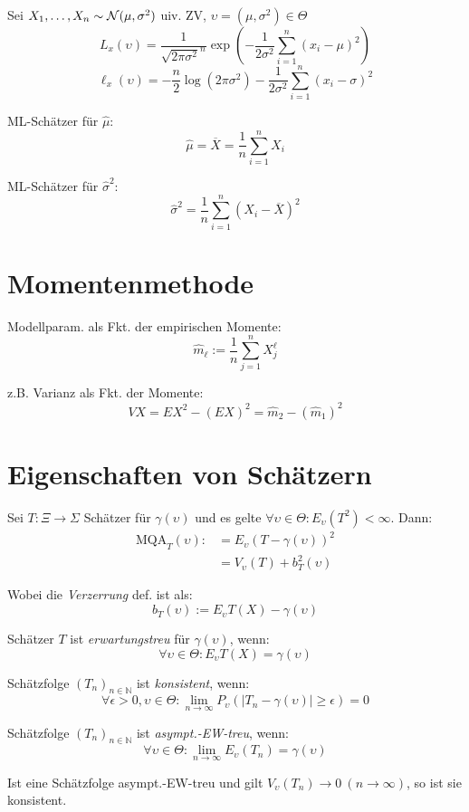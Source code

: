Sei \(X_1, \dots, X_n \sim \mathcal{N}(\mu,\sigma^2)\) uiv. ZV, \(\upsilon = (\mu,\sigma^2) \in \Theta\)
\[ L_x(\upsilon) = \frac{1}{\sqrt{2\pi\sigma^2}^n} \exp\left( -\frac{1}{2\sigma^2} \sum_{i=1}^n (x_i-\mu)^2 \right) \]
\[ \ell_x(\upsilon) = -\frac{n}{2} \log(2\pi\sigma^2) - \frac{1}{2\sigma^2} \sum_{i=1}^n (x_i-\sigma)^2 \]

ML-Schätzer für \(\hat\mu\):
\[ \hat\mu = \overline X = \frac{1}{n}\sum_{i=1}^n X_i \]

ML-Schätzer für \(\hat\sigma^2\):
\[ \hat\sigma^2 = \frac{1}{n}\sum_{i=1}^n (X_i-\overline X)^2 \]

\section*{Momentenmethode}

Modellparam. als Fkt. der empirischen Momente:
\[ \hat m_\ell := \frac{1}{n} \sum_{j=1}^n X_j^\ell \]

z.B. Varianz als Fkt. der Momente:
\[ VX = EX^2 - (EX)^2 = \hat m_2 - (\hat m_1)^2 \]

\section*{Eigenschaften von Schätzern}

Sei \(T : \Xi \to \Sigma\) Schätzer für \(\gamma(\upsilon)\) und es gelte \(\forall \upsilon \in \Theta : E_\upsilon(T^2) < \infty\). Dann:
\begin{align*}
\text{MQA}_T(\upsilon) :&= E_\upsilon(T-\gamma(\upsilon))^2 \\
&= V_\upsilon(T) + b_T^2(\upsilon)
\end{align*}

Wobei die \emph{Verzerrung} def. ist als:
\[ b_T(\upsilon) := E_\upsilon T(X) - \gamma(\upsilon) \]

Schätzer \(T\) ist \emph{erwartungstreu} für \(\gamma(\upsilon)\), wenn:
\[ \forall \upsilon \in \Theta : E_\upsilon T(X) = \gamma(\upsilon) \]

Schätzfolge \((T_n)_{n \in \mathbb{N}}\) ist \emph{konsistent}, wenn:
\[ \forall \epsilon > 0, \upsilon \in \Theta : \lim_{n\to\infty} P_\upsilon(|T_n - \gamma(\upsilon)| \geq \epsilon) = 0 \]

Schätzfolge \((T_n)_{n \in \mathbb{N}}\) ist \emph{asympt.-EW-treu}, wenn:
\[ \forall \upsilon \in \Theta : \lim_{n\to\infty} E_\upsilon(T_n) = \gamma(\upsilon) \]

Ist eine Schätzfolge asympt.-EW-treu und gilt \(V_\upsilon(T_n) \to 0 \ (n\to\infty)\), so ist sie konsistent.

